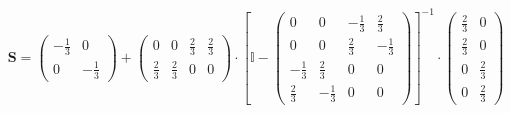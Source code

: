 \documentclass[10pt]{article} \usepackage{amsmath} \usepackage{bbold}
\begin{document}
\[ \mathbf{S} = \left(\begin{array}{cc} -\frac{1}{3} & 0 \\ 0 &
-\frac{1}{3} \end{array}\right) + \left(\begin{array}{cccc} 0 & 0 &
\frac{2}{3} & \frac{2}{3} \\ \frac{2}{3} & \frac{2}{3} & 0 & 0
\end{array}\right) \cdot \left[ \mathbb{I}  -
\left(\begin{array}{cccc} 0 & 0 & -\frac{1}{3} & \frac{2}{3} \\ 0 & 0
& \frac{2}{3} & -\frac{1}{3} \\ -\frac{1}{3} & \frac{2}{3} & 0 & 0 \\
\frac{2}{3} & -\frac{1}{3} & 0 & 0 \end{array}\right) \right]^{-1}
\cdot\left(\begin{array}{cc} \frac{2}{3} & 0 \\ \frac{2}{3} & 0 \\ 0 &
\frac{2}{3} \\ 0 & \frac{2}{3} \end{array}\right) \]
\end{document}
